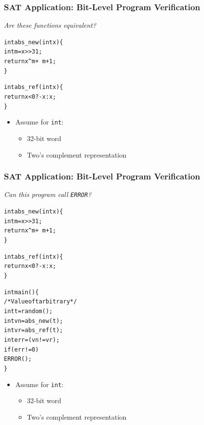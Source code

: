 \documentclass[t,pdf]{beamer}
\newenvironment{ccode}{\begin{alltt}\footnotesize}{\end{alltt}}
\begin{document}
\begin{frame}[fragile]
  \frametitle{SAT Application: Bit-Level Program Verification}
{\large \em  \textcolor{xblue}{Are these functions equivalent?}}\\
\medskip

\begin{minipage}[t]{0.48\textwidth}
\begin{ccode}
int abs_new(int x) \verb:{:
  int m = x>>31;
  return x^m + ~m + 1;
\verb:}:

int abs_ref(int x) \verb:{:
  return x < 0 ? -x : x;
\verb:}:    
\end{ccode}
\end{minipage}
\begin{minipage}[t]{0.48\textwidth}
\begin{ccode}
\end{ccode}
\end{minipage}

\medskip
\begin{itemize}
\item Assume for {\tt int}:
  \begin{itemize}
  \item 32-bit word
  \item Two's complement representation
  \end{itemize}
\end{itemize}
\end{frame}

\begin{frame}[fragile]
  \frametitle{SAT Application: Bit-Level Program Verification}
{\large \em \textcolor{xblue}{Can this program call \texttt{ERROR}?}}\\

\medskip
\begin{minipage}[t]{0.48\textwidth}
\begin{ccode}
int abs_new(int x) \verb:{:
  int m = x>>31;
  return x^m + ~m + 1;
\verb:}:

int abs_ref(int x) \verb:{:
  return x < 0 ? -x : x;
\verb:}:    
\end{ccode}
\end{minipage}
\begin{minipage}[t]{0.48\textwidth}
\begin{ccode}
int main() \verb:{:
  /* Value of t arbitrary */
  int t = random();
  int vn = abs_new(t);
  int vr = abs_ref(t);
  int err = (vn != vr);
  if (err != 0)
    ERROR();
\verb:}:
\end{ccode}
\end{minipage}

\medskip
\begin{itemize}
\item Assume for {\tt int}:
  \begin{itemize}
  \item 32-bit word
  \item Two's complement representation
  \end{itemize}
\end{itemize}
\end{frame}
\end{document}
